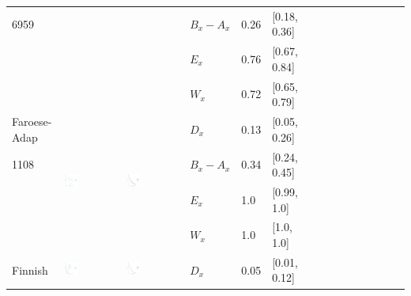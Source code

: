 \documentclass[11pt,letterpaper]{article}
\begin{document}
\begin{longtable}{lllllllllllllll}
6959  &    &    &  $B_x-A_x$  &  0.26  &  [0.18, 0.36]  \\ 
  &    &    &  $E_x$  &  0.76  &  [0.67, 0.84]  \\ 
  &    &    &  $W_x$  &  0.72  &  [0.65, 0.79]  \\ [10.25ex] \hline
Faroese-Adap  &  \multirow{4}{*}{\includegraphics[width=0.25\textwidth]{figures/Faroese-Adap-entropy-memory.pdf}}  &  \multirow{4}{*}{\includegraphics[width=0.25\textwidth]{figures/Faroese-Adap-listener-surprisal-memory.pdf}}  &  $D_x$  &  0.13  &  [0.05, 0.26]  \\ 
1108  &    &    &  $B_x-A_x$  &  0.34  &  [0.24, 0.45]  \\ 
  &    &    &  $E_x$  &  1.0  &  [0.99, 1.0]  \\ 
  &    &    &  $W_x$  &  1.0  &  [1.0, 1.0]  \\ [10.25ex] \hline
Finnish  &  \multirow{4}{*}{\includegraphics[width=0.25\textwidth]{figures/Finnish-entropy-memory.pdf}}  &  \multirow{4}{*}{\includegraphics[width=0.25\textwidth]{figures/Finnish-listener-surprisal-memory.pdf}}  &  $D_x$  &  0.05  &  [0.01, 0.12]  \\ 

\end{longtable}
\end{document}
